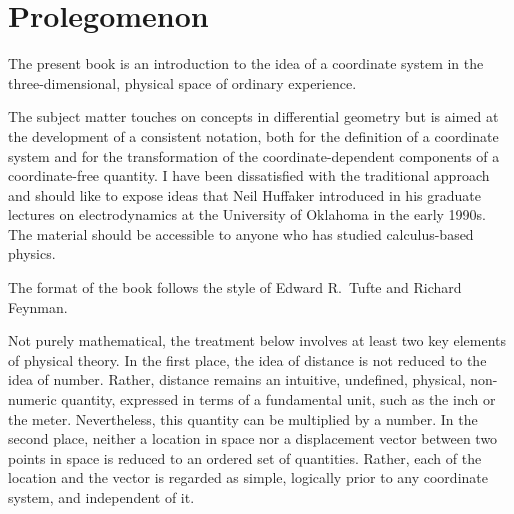 \cleardoublepage
\chapter*{Prolegomenon}

The present book is an introduction to the idea of a coordinate system in the
three-dimensional, physical space of ordinary experience.

The subject matter touches on concepts in differential geometry but is aimed at
the development of a consistent notation, both for the definition of a
coordinate system and for the transformation of the coordinate-dependent
components of a coordinate-free quantity.  I have been dissatisfied with the
traditional approach and should like to expose ideas that Neil Huffaker
introduced in his graduate lectures on electrodynamics at the University of
Oklahoma in the early 1990s.  The material should be accessible to anyone who
has studied calculus-based physics.

The format of the book follows the style of Edward R.~Tufte and Richard
Feynman\cite[-0.5in]{pkg-tufte}.

Not purely mathematical, the treatment below involves at least two key elements
of physical theory.  In the first place, the idea of distance is not reduced to
the idea of number.  Rather, distance remains an intuitive, undefined,
physical, non-numeric quantity, expressed in terms of a fundamental unit, such
as the inch or the meter.  Nevertheless, this quantity can be multiplied by a
number.  In the second place, neither a location in space nor a displacement
vector between two points in space is reduced to an ordered set of quantities.
Rather, each of the location and the vector is regarded as simple, logically
prior to any coordinate system, and independent of it.

